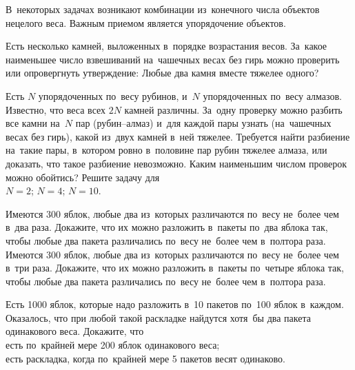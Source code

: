 



В~некоторых задачах возникают комбинации из~конечного числа объектов нецелого
веса.
Важным приемом является упорядочение объектов.

\begin{exercises}

\item
Есть несколько камней, выложенных в~порядке возрастания весов.
За~какое наименьшее число взвешиваний на~чашечных весах без гирь можно
проверить или опровергнуть утверждение: Любые два камня вместе тяжелее одного?

\item
Есть $N$ упорядоченных по~весу рубинов, и~$N$ упорядоченных по~весу алмазов.
Известно, что веса всех $2N$ камней различны.
За~одну проверку можно разбить все камни на~$N$ пар (рубин--алмаз) и~для каждой
пары узнать (на~чашечных весах без гирь), какой из~двух камней в~ней тяжелее.
Требуется найти разбиение на~такие пары, в~котором ровно в~половине пар рубин
тяжелее алмаза, или доказать, что такое разбиение невозможно.
Каким наименьшим числом проверок можно обойтись?
Решите задачу для
\\
\subproblem $N = 2$;
\qquad
\subproblem $N = 4$;
\qquad
\subproblem $N = 10$.

\item
\subproblem
Имеются 300 яблок, любые два из~которых различаются по~весу не~более чем
в~два раза.
Докажите, что их можно разложить в~пакеты по~два яблока так, чтобы любые два
пакета различались по~весу не~более чем в~полтора раза.
\\
\subproblem
Имеются 300 яблок, любые два из~которых различаются по~весу не~более чем в~три
раза.
Докажите, что их можно разложить в~пакеты по~четыре яблока так, чтобы любые два
пакета различались по~весу не~более чем в~полтора раза.

\item
Есть 1000 яблок, которые надо разложить в~10 пакетов по~100 яблок в~каждом.
Оказалось, что при любой такой раскладке найдутся хотя~бы два пакета
одинакового веса.
Докажите, что
\\
\subproblem есть по~крайней мере 200 яблок одинакового веса;
\\
\subproblem есть раскладка, когда по~крайней мере 5 пакетов весят одинаково.

\end{exercises}

